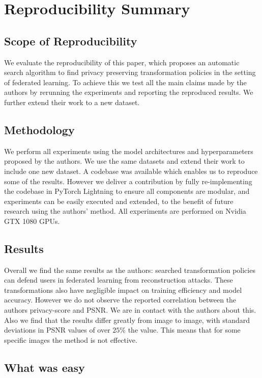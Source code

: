 \section{Reproducibility Summary}
\subsection{Scope of Reproducibility}
We evaluate the reproducibility of this paper, which proposes an automatic search algorithm to find privacy preserving transformation policies in the setting of federated learning. To achieve this we test all the main claims made by the authors by rerunning the experiments and reporting the reproduced results. We further extend their work to a new dataset.

\subsection{Methodology}
We perform all experiments using the model architectures and hyperparameters proposed by the authors. We use the same datasets and extend their work to include one new dataset. A codebase was available which enables us to reproduce some of the results. However we deliver a contribution by fully re-implementing the codebase in PyTorch Lightning to ensure all components are modular, and experiments can be easily executed and extended, to the benefit of future research using the authors' method. All experiments are performed on Nvidia GTX 1080 GPUs.

\subsection{Results}
Overall we find the same results as the authors: searched transformation policies can defend users in federated learning from reconstruction attacks. These transformations also have negligible impact on training efficiency and model accuracy. However we do not observe the reported correlation between the authors privacy-score and PSNR. We are in contact with the authors about this. Also we find that the results differ greatly from image to image, with standard deviations in PSNR values of over $25\%$ the value. This means that for some specific images the method is not effective.

\subsection{What was easy}

